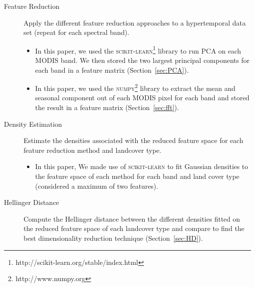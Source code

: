 \documentclass{article}
\begin{document}
\begin{description}
 \item[Feature Reduction] Apply the different feature reduction approaches to a hypertemporal data set (repeat for each spectral band).
 \begin{itemize}
  \item In this paper, we used the \textsc{scikit-learn}\footnote{http://scikit-learn.org/stable/index.html} library to run PCA on each MODIS band. We then stored the two largest principal components for each band in a feature matrix (Section~\ref{sec:PCA}). 
  \item In this paper, we used the \textsc{numpy}\footnote{http://www.numpy.org} library to extract the mean and seasonal component out of each MODIS pixel for each band and stored the result in a feature matrix (Section~\ref{sec:fft}). 
 \end{itemize}
 \item[Density Estimation] Estimate the densities associated with the reduced feature space for each feature reduction method and landcover type. 
 \begin{itemize}
  \item In this paper, We made use of \textsc{scikit-learn} to fit Gaussian densities to the feature space of each method for each band and land cover type (considered a maximum of two features). 
 \end{itemize}
 \item[Hellinger Distance] Compute the Hellinger distance between the different densities fitted on the reduced feature space of each landcover type and compare to 
 find the best dimensionality reduction technique (Section~\ref{sec:HD}). 
\end{description}
\end{document}
